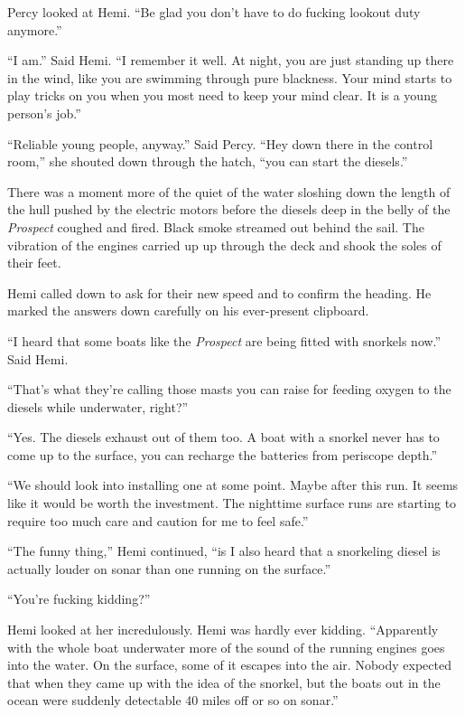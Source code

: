\documentclass[]{scrbook}
\begin{document}
Percy looked at Hemi. ``Be glad you don't have to do fucking lookout
duty anymore.''

``I am.'' Said Hemi. ``I remember it well. At night, you are just
standing up there in the wind, like you are swimming through pure
blackness. Your mind starts to play tricks on you when you most need to
keep your mind clear. It is a young person's job.''

``Reliable young people, anyway.'' Said Percy. ``Hey down there in the
control room,'' she shouted down through the hatch, ``you can start the
diesels.''

There was a moment more of the quiet of the water sloshing down the
length of the hull pushed by the electric motors before the diesels deep
in the belly of the \emph{Prospect} coughed and fired. Black smoke
streamed out behind the sail. The vibration of the engines carried up up
through the deck and shook the soles of their feet.

Hemi called down to ask for their new speed and to confirm the heading.
He marked the answers down carefully on his ever-present clipboard.

``I heard that some boats like the \emph{Prospect} are being fitted with
snorkels now.'' Said Hemi.

``That's what they're calling those masts you can raise for feeding
oxygen to the diesels while underwater, right?''

``Yes. The diesels exhaust out of them too. A boat with a snorkel never
has to come up to the surface, you can recharge the batteries from
periscope depth.''

``We should look into installing one at some point. Maybe after this
run. It seems like it would be worth the investment. The nighttime
surface runs are starting to require too much care and caution for me to
feel safe.''

``The funny thing,'' Hemi continued, ``is I also heard that a snorkeling
diesel is actually louder on sonar than one running on the surface.''

``You're fucking kidding?''

Hemi looked at her incredulously. Hemi was hardly ever kidding.
``Apparently with the whole boat underwater more of the sound of the
running engines goes into the water. On the surface, some of it escapes
into the air. Nobody expected that when they came up with the idea of
the snorkel, but the boats out in the ocean were suddenly detectable 40
miles off or so on sonar.''
\end{document}

